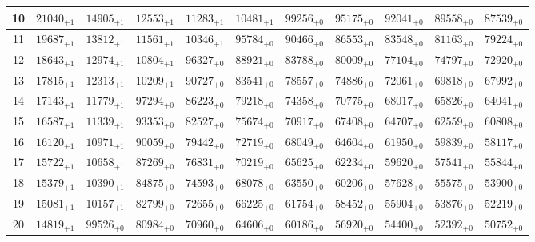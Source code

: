 \documentclass[10pt, a4paper]{article}
\begin{document}
\begin{center}
\begin{tabular}{c || c c c c c | c c c c c}
        10 & \({21040}_{+1}\) & \({14905}_{+1}\) & \({12553}_{+1}\) & \({11283}_{+1}\) & \({10481}_{+1}\) & \({99256}_{+0}\) & \({95175}_{+0}\) & \({92041}_{+0}\) & \({89558}_{+0}\) & \({87539}_{+0}\)\\
        \hline
        11 & \({19687}_{+1}\) & \({13812}_{+1}\) & \({11561}_{+1}\) & \({10346}_{+1}\) & \({95784}_{+0}\) & \({90466}_{+0}\) & \({86553}_{+0}\) & \({83548}_{+0}\) & \({81163}_{+0}\) & \({79224}_{+0}\)\\
        12 & \({18643}_{+1}\) & \({12974}_{+1}\) & \({10804}_{+1}\) & \({96327}_{+0}\) & \({88921}_{+0}\) & \({83788}_{+0}\) & \({80009}_{+0}\) & \({77104}_{+0}\) & \({74797}_{+0}\) & \({72920}_{+0}\)\\
        13 & \({17815}_{+1}\) & \({12313}_{+1}\) & \({10209}_{+1}\) & \({90727}_{+0}\) & \({83541}_{+0}\) & \({78557}_{+0}\) & \({74886}_{+0}\) & \({72061}_{+0}\) & \({69818}_{+0}\) & \({67992}_{+0}\)\\
        14 & \({17143}_{+1}\) & \({11779}_{+1}\) & \({97294}_{+0}\) & \({86223}_{+0}\) & \({79218}_{+0}\) & \({74358}_{+0}\) & \({70775}_{+0}\) & \({68017}_{+0}\) & \({65826}_{+0}\) & \({64041}_{+0}\)\\
        15 & \({16587}_{+1}\) & \({11339}_{+1}\) & \({93353}_{+0}\) & \({82527}_{+0}\) & \({75674}_{+0}\) & \({70917}_{+0}\) & \({67408}_{+0}\) & \({64707}_{+0}\) & \({62559}_{+0}\) & \({60808}_{+0}\)\\
        \hline
        16 & \({16120}_{+1}\) & \({10971}_{+1}\) & \({90059}_{+0}\) & \({79442}_{+0}\) & \({72719}_{+0}\) & \({68049}_{+0}\) & \({64604}_{+0}\) & \({61950}_{+0}\) & \({59839}_{+0}\) & \({58117}_{+0}\)\\
        17 & \({15722}_{+1}\) & \({10658}_{+1}\) & \({87269}_{+0}\) & \({76831}_{+0}\) & \({70219}_{+0}\) & \({65625}_{+0}\) & \({62234}_{+0}\) & \({59620}_{+0}\) & \({57541}_{+0}\) & \({55844}_{+0}\)\\
        18 & \({15379}_{+1}\) & \({10390}_{+1}\) & \({84875}_{+0}\) & \({74593}_{+0}\) & \({68078}_{+0}\) & \({63550}_{+0}\) & \({60206}_{+0}\) & \({57628}_{+0}\) & \({55575}_{+0}\) & \({53900}_{+0}\)\\
        19 & \({15081}_{+1}\) & \({10157}_{+1}\) & \({82799}_{+0}\) & \({72655}_{+0}\) & \({66225}_{+0}\) & \({61754}_{+0}\) & \({58452}_{+0}\) & \({55904}_{+0}\) & \({53876}_{+0}\) & \({52219}_{+0}\)\\
        20 & \({14819}_{+1}\) & \({99526}_{+0}\) & \({80984}_{+0}\) & \({70960}_{+0}\) & \({64606}_{+0}\) & \({60186}_{+0}\) & \({56920}_{+0}\) & \({54400}_{+0}\) & \({52392}_{+0}\) & \({50752}_{+0}\)\\

\end{tabular}
\end{center}
\end{document}
